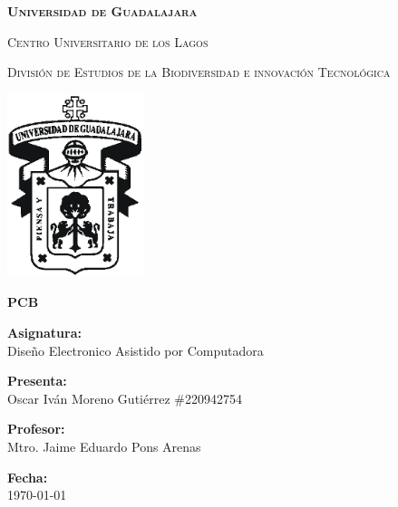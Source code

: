 \documentclass[12pt]{report}
\begin{document}
\setlength{\hoffset}{27 pt} %
\begin{titlepage}
{\centering
{\scshape\bfseries\fontsize{29.16}{34.992}\selectfont Universidad de Guadalajara \par}
\vspace{0.5cm}
{\scshape\Large Centro Universitario de los Lagos \par}
\vspace{1cm}
{\scshape\Large División de Estudios de la Biodiversidad e innovación Tecnológica \par}
\vspace{1cm}
{\graphicspath{{imagenes/Portada}} %
\includegraphics[width=0.3\textwidth]{image.png}\par}
\vspace{1cm}
{\scshape\large\bfseries PCB \par}
\vspace{1.5cm}
{\large \textbf{Asignatura:} \\Diseño Electronico Asistido por Computadora\par}
\vfill
{\large \textbf{Presenta:} \\Oscar Iván Moreno Gutiérrez \#220942754\par}
\vfill
{\large \textbf{Profesor:} \\Mtro. Jaime Eduardo Pons Arenas \par}
\vfill
\vfill
\begin{flushright}
  {\normalsize \textbf {Fecha:} \\ \today}
\end{flushright}
\vfill}
{\large  \par}
\end{titlepage}

\tableofcontents
\newpage
\end{document}
